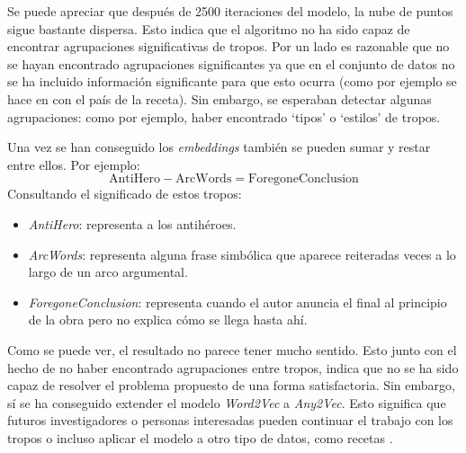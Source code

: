 Se puede apreciar que después de 2500 iteraciones del modelo, la nube de puntos sigue bastante dispersa. Esto indica que el algoritmo no ha sido capaz de encontrar
agrupaciones significativas de tropos. Por un lado es razonable que no se hayan encontrado agrupaciones significantes ya que en el conjunto de datos no se ha incluido
información significante para que esto ocurra (como por ejemplo se hace en \cite{kazama2018neural} con el país de la receta). Sin embargo, se esperaban detectar algunas
agrupaciones: como por ejemplo, haber encontrado `tipos' o `estilos' de tropos.

Una vez se han conseguido los \textit{embeddings} también se pueden sumar y restar entre ellos. Por ejemplo:
\begin{equation}
  \text{AntiHero} - \text{ArcWords} = \text{ForegoneConclusion}
\end{equation}
Consultando el significado de estos tropos:
\begin{itemize}
  \item \textit{AntiHero}: representa a los antihéroes.
  \item \textit{ArcWords}: representa alguna frase simbólica que aparece reiteradas veces a lo largo de un arco argumental.
  \item \textit{ForegoneConclusion}: representa cuando el autor anuncia el final al principio de la obra pero no explica cómo se llega hasta ahí.
\end{itemize}
Como se puede ver, el resultado no parece tener mucho sentido. Esto junto con el hecho de no haber encontrado agrupaciones entre tropos, indica que no se ha sido capaz
de resolver el problema propuesto de una forma satisfactoria. Sin embargo, sí se ha conseguido extender el modelo \textit{Word2Vec} a \textit{Any2Vec}. Esto significa
que futuros investigadores o personas interesadas pueden continuar el trabajo con los tropos o incluso aplicar el modelo a otro tipo de datos, como recetas \cite{kazama2018neural}.